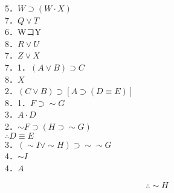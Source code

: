 5．$W \supset(W \cdot X)$\\
7．$Q \vee T$\\
6．WコY\\
8．$R \vee U$\\
7．$Z \vee X$\\
7．1．$(A \vee B) \supset C$\\
8．$X$\\
2．$(C \vee B) \supset[A \supset(D \equiv E)]$\\
8．1．$F \supset \sim G$\\
3．$A \cdot D$\\
2．$\sim F \supset(H \supset \sim G)$\\
$\therefore D \equiv E$\\
3．$(\sim I \vee \sim H) \supset \sim \sim G$\\
4．$\sim I$\\
4．$A$

$$
\therefore \sim H
$$

